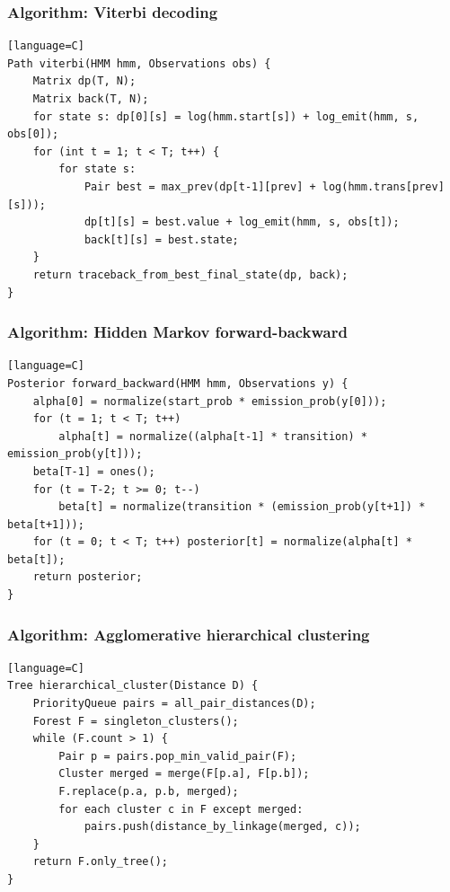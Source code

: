 \documentclass[11pt]{article}
\begin{document}
\subsubsection{Algorithm: Viterbi decoding}\label{algorithm-viterbi-decoding}

\begin{verbatim}[language=C]
Path viterbi(HMM hmm, Observations obs) {
    Matrix dp(T, N);
    Matrix back(T, N);
    for state s: dp[0][s] = log(hmm.start[s]) + log_emit(hmm, s, obs[0]);
    for (int t = 1; t < T; t++) {
        for state s:
            Pair best = max_prev(dp[t-1][prev] + log(hmm.trans[prev][s]));
            dp[t][s] = best.value + log_emit(hmm, s, obs[t]);
            back[t][s] = best.state;
    }
    return traceback_from_best_final_state(dp, back);
}
\end{verbatim}

\subsubsection{Algorithm: Hidden Markov forward-backward}\label{algorithm-hidden-markov-forward-backward}

\begin{verbatim}[language=C]
Posterior forward_backward(HMM hmm, Observations y) {
    alpha[0] = normalize(start_prob * emission_prob(y[0]));
    for (t = 1; t < T; t++)
        alpha[t] = normalize((alpha[t-1] * transition) * emission_prob(y[t]));
    beta[T-1] = ones();
    for (t = T-2; t >= 0; t--)
        beta[t] = normalize(transition * (emission_prob(y[t+1]) * beta[t+1]));
    for (t = 0; t < T; t++) posterior[t] = normalize(alpha[t] * beta[t]);
    return posterior;
}
\end{verbatim}

\subsubsection{Algorithm: Agglomerative hierarchical clustering}\label{algorithm-agglomerative-hierarchical-clustering}

\begin{verbatim}[language=C]
Tree hierarchical_cluster(Distance D) {
    PriorityQueue pairs = all_pair_distances(D);
    Forest F = singleton_clusters();
    while (F.count > 1) {
        Pair p = pairs.pop_min_valid_pair(F);
        Cluster merged = merge(F[p.a], F[p.b]);
        F.replace(p.a, p.b, merged);
        for each cluster c in F except merged:
            pairs.push(distance_by_linkage(merged, c));
    }
    return F.only_tree();
}
\end{verbatim}
\end{document}

